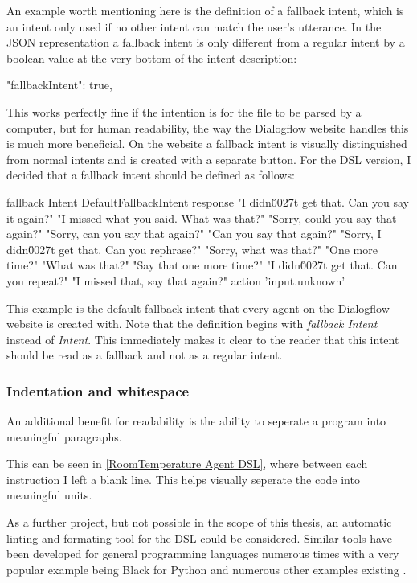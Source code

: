 An example worth mentioning here is the definition of a fallback intent, which is an intent only used if no other intent can match the user's utterance.
In the JSON representation a fallback intent is only different from a regular intent by a boolean value at the very bottom of the intent description:
\begin{JSON}
    "fallbackIntent": true,
\end{JSON}
This works perfectly fine if the intention is for the file to be parsed by a computer, but for human readability, the way the Dialogflow website handles this is much more beneficial.
On the website a fallback intent is visually distinguished from normal intents and is created with a separate button.
For the DSL version, I decided that a fallback intent should be defined as follows:
\begin{DSL}
    fallback Intent DefaultFallbackIntent
        response 
            "I didn\u0027t get that. Can you say it again?"
            "I missed what you said. What was that?"
            "Sorry, could you say that again?"
            "Sorry, can you say that again?"
            "Can you say that again?"
            "Sorry, I didn\u0027t get that. Can you rephrase?"
            "Sorry, what was that?"
            "One more time?"
            "What was that?"
            "Say that one more time?"
            "I didn\u0027t get that. Can you repeat?"
            "I missed that, say that again?"
        action 'input.unknown'
\end{DSL}
This example is the default fallback intent that every agent on the Dialogflow website is created with. Note that the definition begins with \textit{fallback Intent} instead of \textit{Intent}. This immediately makes it clear to the reader that this intent should be read as a fallback and not as a regular intent.

\subsubsection{Indentation and whitespace}

An additional benefit for readability is the ability to seperate a program into meaningful paragraphs.

This can be seen in \autoref{RoomTemperature Agent DSL}, where between each instruction I left a blank line. This helps visually seperate the code into meaningful units.

As a further project, but not possible in the scope of this thesis, an automatic linting and formating tool for the DSL could be considered. Similar tools have been developed for general programming languages numerous times with a very popular example being Black for Python \cite{Python} and numerous other examples existing \cite{Github}.

